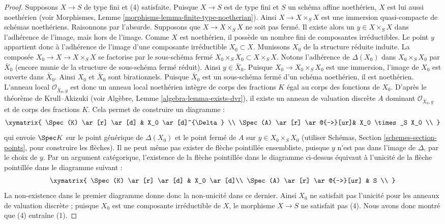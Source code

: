 \begin{proof}
\medskip\noindent
Supposons $X \to S$ de type fini et (4) satisfaite.
Puisque $X \to S$ est de type fini et $S$ un schéma affine
noethérien, $X$ est lui aussi noethérien (voir
Morphismes, Lemme \ref{morphisms-lemma-finite-type-noetherian}).
Ainsi $X \to X \times_S X$ est
une immersion quasi-compacte de schémas noethériens. Raisonnons par
l'absurde. Supposons que $X \to X \times_S X$ ne soit pas fermé.
Il existe alors un $y \in X \times_S X$ dans l'adhérence de l'image, mais
hors de l'image. Comme $X$ est noethérien, il possède un nombre fini de composantes
irréductibles. Le point $y$ appartient donc à l'adhérence de l'image d'une
composante irréductible $X_0 \subset X$. Munissons $X_0$ de la structure
réduite induite. La composée $X_0 \to X \to X \times_S X$
se factorise par le sous-schéma fermé $X_0 \times_S X_0 \subset X \times_S X$.
Notons l'adhérence de $\Delta(X_0)$ dans $X_0 \times_S X_0$
par $\bar X_0$ (encore munie de la structure de sous-schéma fermé réduit). Ainsi $y \in \bar X_0$.
Puisque $X_0 \to X_0 \times_S X_0$ est une immersion, l'image de $X_0$
est ouverte dans $\bar X_0$. Ainsi $X_0$ et $\bar X_0$ sont
birationnels. Puisque $\bar{X}_0$ est un sous-schéma fermé d'un
schéma noethérien, il est noethérien. L'anneau local
$\mathcal O_{{\bar X_0, y}}$ est donc un anneau local noethérien intègre de corps des
fractions $K$ égal au corps des fonctions de $X_0$. D'après le théorème de Krull--Akizuki
(voir Algèbre, Lemme \ref{algebra-lemma-exists-dvr}), il existe un
anneau de valuation discrète $A$ dominant $\mathcal O_{{\bar X_0, y}}$
et de corps des fractions $K$. Cela permet de construire un diagramme :
\begin{equation}
\label{equation-valuative-generic}
\xymatrix{
\Spec(K) \ar[r] \ar[d] & X_0 \ar[d]^{\Delta} \\
\Spec(A) \ar[r] \ar@{-->}[ur]& X_0 \times_S X_0 \\
}
\end{equation}
qui envoie $\Spec K$ sur le point générique de $\Delta(X_0)$ et
le point fermé de $A$ sur $y \in X_0 \times_S X_0$ (utiliser
Schémas, Section \ref{schemes-section-points}, pour construire les flèches).
Il ne peut même pas exister de
flèche pointillée ensembliste, puisque $y$ n'est pas dans l'image de
$\Delta$, par le choix de $y$. Par un argument catégorique, l'existence
de la flèche pointillée dans le diagramme ci-dessus équivaut à l'unicité
de la flèche pointillée dans le diagramme suivant :
\begin{equation}
\label{equation-valuative-nonexistent}
\xymatrix{
\Spec(K) \ar[r] \ar[d] & X_0 \ar[d]\\
\Spec(A) \ar[r] \ar@{-->}[ur] & S \\
}
\end{equation}
La non-existence dans le premier diagramme donne donc la non-unicité dans
ce dernier. Ainsi $X_0$ ne satisfait pas
l'unicité pour les anneaux de valuation discrète ; puisque $X_0$ est une
composante irréductible de $X$, le morphisme $X \to S$ ne satisfait pas
(4). Nous avons donc montré que (4) entraîne (1).
\end{proof}

